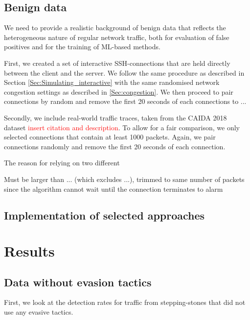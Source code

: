 \documentclass[conference]{IEEEtran}\usepackage[]{graphicx}\usepackage[]{color}
\begin{document}
 
\subsection{Benign data}

We need to provide a realistic background of benign data that reflects the heterogeneous nature of regular network traffic, both for evaluation of false positives and for the training of ML-based methods.

First, we created a set of interactive SSH-connections that are held directly between the client and the server. We follow the same procedure as described in Section \ref{Sec:Simulating_interactive} with the same randomised network congestion settings as described in \ref{Sec:congestion}. We then proceed to pair connections by random and remove the first 20 seconds of each connections to ...

Secondly, we include real-world traffic traces, taken from the CAIDA 2018 dataset \textcolor{red}{insert citation and description}. To allow for a fair comparison, we only selected connections that contain at least 1000 packets. Again, we pair connections randomly and remove the first 20 seconds of each connection. 


The reason for relying on two different 

Must be larger than ... (which excludes ...), trimmed to same number of packets since the algorithm cannot wait until the connection terminates to alarm

\subsection{Implementation of selected approaches}


\section{Results}


\subsection{Data without evasion tactics}

First, we look at the detection rates for traffic from stepping-stones that did not use any evasive tactics. 
\end{document}
